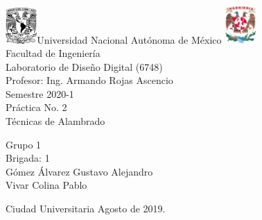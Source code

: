 

\begin{titlepage}
     \begin{center}
	\includegraphics[width=0.09\textwidth]{UNAM}\Large Universidad Nacional Autónoma de México
        	\includegraphics[width=0.09\textwidth]{FI}\\[1cm]
        \Large Facultad de Ingeniería\\[1cm]
         \Large Laboratorio de Diseño Digital (6748)\\[1cm]
         \footnotesize Profesor: Ing. Armando Rojas Ascencio\\[1cm]
        \footnotesize Semestre 2020-1\\[1cm]
        
       

        \Large Práctica No. 2\\[1cm]
        
           

\Large Técnicas de Alambrado
        
          \begin{flushright}
\footnotesize  Grupo 1\\[0.5cm]
\footnotesize Brigada: 1\\[0.5cm]
\footnotesize Gómez Álvarez Gustavo Alejandro\\[0.5cm]
\footnotesize Vivar Colina Pablo\\[0.5cm]
 \end{flushright}
          \begin{flushleft}
        \footnotesize Ciudad Universitaria Agosto de 2019.\\
          \end{flushleft}
         
          
   \end{center}
\end{titlepage}
